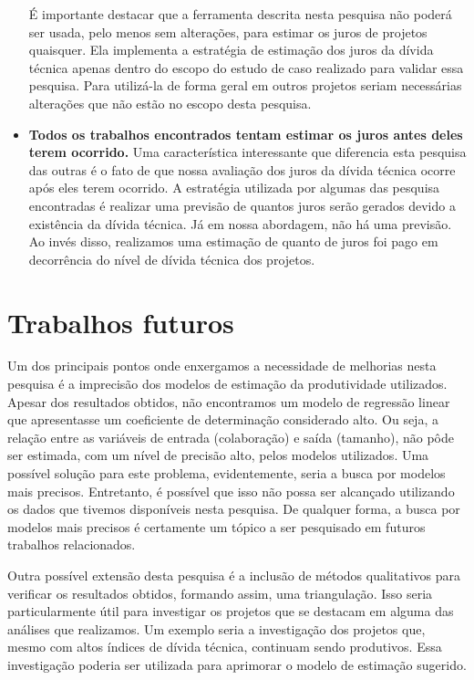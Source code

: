 \begin{itemize}
É importante destacar que a ferramenta descrita nesta pesquisa não poderá ser usada, pelo menos sem alterações, para estimar os juros de projetos quaisquer. Ela implementa a estratégia de estimação dos juros da dívida técnica apenas dentro do escopo do estudo de caso realizado para validar essa pesquisa. Para utilizá-la de forma geral em outros projetos seriam necessárias alterações que não estão no escopo desta pesquisa. 

\item \textbf{Todos os trabalhos encontrados tentam estimar os juros antes deles terem ocorrido.} Uma característica interessante que diferencia esta pesquisa das outras é o fato de que nossa avaliação dos juros da dívida técnica ocorre após eles terem ocorrido. A estratégia utilizada por algumas das pesquisa encontradas é realizar uma previsão de quantos juros serão gerados devido a existência da dívida técnica. Já em nossa abordagem, não há uma previsão. Ao invés disso, realizamos uma estimação de quanto de juros foi pago em decorrência do nível de dívida técnica dos projetos. 

\end{itemize}

\section{Trabalhos futuros}

Um dos principais pontos onde enxergamos a necessidade de melhorias nesta pesquisa é a imprecisão dos modelos de estimação da produtividade utilizados. Apesar dos resultados obtidos, não encontramos um modelo de regressão linear que apresentasse um coeficiente de determinação considerado alto. Ou seja, a relação entre as variáveis de entrada (colaboração) e saída (tamanho), não pôde ser estimada, com um nível de precisão alto, pelos modelos utilizados. Uma possível solução  para este problema, evidentemente, seria a busca por modelos mais precisos. Entretanto, é possível que isso não possa ser alcançado utilizando os dados que tivemos disponíveis nesta pesquisa. De qualquer forma, a busca por modelos mais precisos é certamente um tópico a ser pesquisado em futuros trabalhos relacionados.

Outra possível extensão desta pesquisa é a inclusão de métodos qualitativos para verificar os resultados obtidos, formando assim, uma triangulação\cite{fielding2012triangulation}. Isso seria particularmente útil para investigar os projetos que se destacam em alguma das análises que realizamos. Um exemplo seria a investigação dos projetos que, mesmo com altos índices de dívida técnica, continuam sendo produtivos. Essa investigação poderia ser utilizada para aprimorar o modelo de estimação sugerido. 

